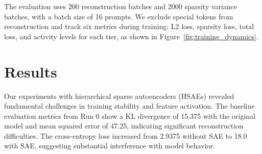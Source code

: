 \documentclass{article} %
\begin{document}
The evaluation uses 200 reconstruction batches and 2000 sparsity variance batches, with a batch size of 16 prompts. We exclude special tokens from reconstruction and track six metrics during training: L2 loss, sparsity loss, total loss, and activity levels for each tier, as shown in Figure~\ref{fig:training_dynamics}.

\section{Results}
\label{sec:results}

Our experiments with hierarchical sparse autoencoders (HSAEs) revealed fundamental challenges in training stability and feature activation. The baseline evaluation metrics from Run 0 show a KL divergence of 15.375 with the original model and mean squared error of 47.25, indicating significant reconstruction difficulties. The cross-entropy loss increased from 2.9375 without SAE to 18.0 with SAE, suggesting substantial interference with model behavior.
\end{document}
